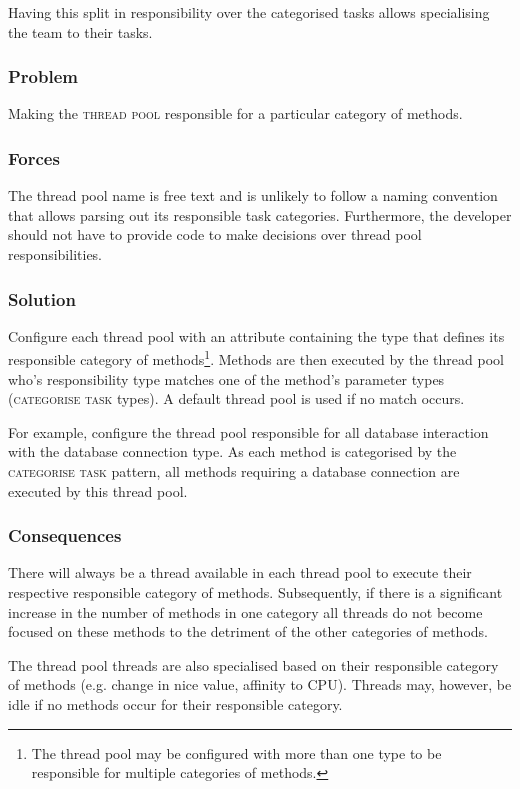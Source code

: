 \documentclass[prodmode]{style/acmlarge}
\begin{document}
Having this split in responsibility over the categorised tasks allows
specialising the team to their tasks.

\subsubsection*{Problem} Making the \textsc{thread pool} responsible for a
particular category of methods.

\subsubsection*{Forces} The thread pool name is free text and is unlikely to
follow a naming convention that allows parsing out its responsible task
categories.  Furthermore, the developer should not have to provide code to make
decisions over thread pool responsibilities.

\subsubsection*{Solution} Configure each thread pool with an attribute
containing the type that defines its responsible category of
methods\footnote{The thread pool may be configured with more than one type to be
responsible for multiple categories of methods.}. Methods are then executed by
the thread pool who's responsibility type matches one of the method's parameter
types (\textsc{categorise task} types).  A default thread pool is used if no
match occurs.

For example, configure the thread pool responsible for all database interaction
with the database connection type.  As each method is categorised by the
\textsc{categorise task} pattern, all methods requiring a database connection
are executed by this thread pool.

\subsubsection*{Consequences} There will always be a thread available in each
thread pool to execute their respective responsible category of methods. 
Subsequently, if there is a significant increase in the number of methods in one
category all threads do not become focused on these methods to the detriment of
the other categories of methods.

The thread pool threads are also specialised based on their responsible
category of methods (e.g. change in nice value, affinity to CPU).  Threads may,
however, be idle if no methods occur for their responsible category.
\end{document}
